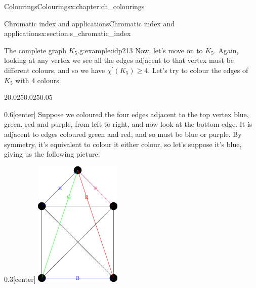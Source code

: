 \documentclass[oneside,10pt,]{book}
\numberwithin{equation}{section}
\begin{document}
\begin{chapterptx}{Colourings}{}{Colourings}{}{}{x:chapter:ch_colourings}
\begin{sectionptx}{Chromatic index and applications}{}{Chromatic index and applications}{}{}{x:section:s_chromatic_index}
\begin{example}{The complete graph \(K_5\).}{g:example:idp213}
Now, let's move on to \(K_5\).  Again, looking at any vertex we see all the edges adjacent to that vertex must be different colours, and so we have \(\chi^\prime(K_5)\geq 4\).   Let's try to colour the edges of \(K_5\) with 4 colours.%
\begin{sidebyside}{2}{0.025}{0.025}{0.05}%
\begin{sbspanel}{0.6}[center]%
Suppose we coloured the four edges adjacent to the top vertex blue, green, red and purple, from left to right, and now look at the bottom edge.  It is adjacent to edges coloured green and red, and so must be blue or purple.  By symmetry, it's equivalent to colour it either colour, so let's suppose it's blue, giving us the following picture:%
\end{sbspanel}%
\begin{sbspanel}{0.3}[center]%
\includegraphics[width=\linewidth]{images/K5EdgeColouring1.png}

\end{sbspanel}
\end{sidebyside}
\end{example}
\end{sectionptx}
\end{chapterptx}
\end{document}
